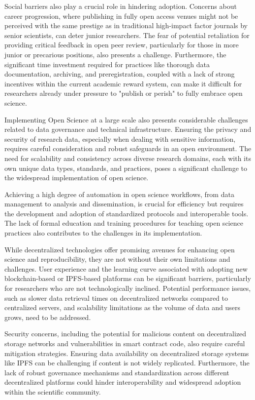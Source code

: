 \documentclass{article}
\begin{document}
Social barriers also play a crucial role in hindering adoption. Concerns about career progression, where publishing in fully open access venues might not be perceived with the same prestige as in traditional high-impact factor journals by senior scientists, can deter junior researchers. The fear of potential retaliation for providing critical feedback in open peer review, particularly for those in more junior or precarious positions, also presents a challenge. Furthermore, the significant time investment required for practices like thorough data documentation, archiving, and preregistration, coupled with a lack of strong incentives within the current academic reward system, can make it difficult for researchers already under pressure to "publish or perish" to fully embrace open science.

Implementing Open Science at a large scale also presents considerable challenges related to data governance and technical infrastructure. Ensuring the privacy and security of research data, especially when dealing with sensitive information, requires careful consideration and robust safeguards in an open environment. The need for scalability and consistency across diverse research domains, each with its own unique data types, standards, and practices, poses a significant challenge to the widespread implementation of open science.

Achieving a high degree of automation in open science workflows, from data management to analysis and dissemination, is crucial for efficiency but requires the development and adoption of standardized protocols and interoperable tools. The lack of formal education and training procedures for teaching open science practices also contributes to the challenges in its implementation.

While decentralized technologies offer promising avenues for enhancing open science and reproducibility, they are not without their own limitations and challenges. User experience and the learning curve associated with adopting new blockchain-based or IPFS-based platforms can be significant barriers, particularly for researchers who are not technologically inclined. Potential performance issues, such as slower data retrieval times on decentralized networks compared to centralized servers, and scalability limitations as the volume of data and users grows, need to be addressed.

Security concerns, including the potential for malicious content on decentralized storage networks and vulnerabilities in smart contract code, also require careful mitigation strategies. Ensuring data availability on decentralized storage systems like IPFS can be challenging if content is not widely replicated. Furthermore, the lack of robust governance mechanisms and standardization across different decentralized platforms could hinder interoperability and widespread adoption within the scientific community.
\end{document}
